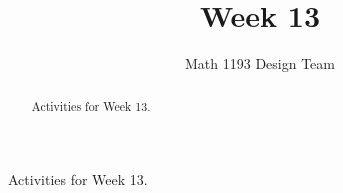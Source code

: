 \documentclass[noauthor]{ximera}
\title{Week 13}
\author{Math 1193 Design Team}
\begin{document}
\begin{abstract}
    Activities for Week 13.
\end{abstract}
\maketitle

Activities for Week 13.
\end{document}
